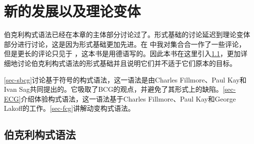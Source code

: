 \section{新的发展以及理论变体}

伯克利构式语法已经在本章的主体部分讨论过了。形式基础的讨论延迟到理论变体部分进行讨论，这是因为形式基础更加先进。在 中我对集合合一作了一些评论，但是更长的评论只见于 ，这本书是用德语写的。因此本书在这里引入\ref{sec-formal-bcg}，更加详细地讨论伯克利构式语法的形式基础并且说明它们并不适于它们原本的目标。

\ref{sec-sbcg}讨论基于符号的构式语法，这一语法是由Charles Fillmore、Paul Kay和Ivan Sag共同提出的。它吸取了BCG的观点，并避免了其形式上的缺陷。\ref{sec-ECG}介绍体验构式语法，这一语法基于Charles Fillmore、Paul Kay和George Lakoff的工作。\ref{sec-fcg}讲解动变构式语法。

\subsection{伯克利构式语法}
\label{sec-formal-bcg}


